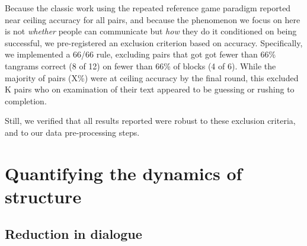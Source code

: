 Because the classic work using the repeated reference game paradigm reported near ceiling accuracy for all pairs, and because the phenomenon we focus on here is not \emph{whether} people can communicate but \emph{how} they do it conditioned on being successful, we pre-registered an exclusion criterion based on accuracy. 
Specifically, we implemented a 66/66 rule, excluding pairs that got got fewer than 66\% tangrams correct (8 of 12) on fewer than 66\% of blocks (4 of 6). 
While the majority of pairs (X\%) were at ceiling accuracy by the final round, this excluded K pairs who on examination of their text appeared to be guessing or rushing to completion.

Still, we verified that all results reported were robust to these exclusion criteria, and to our data pre-processing steps.

\section{Quantifying the dynamics of structure}\label{results}

\subsection{Reduction in dialogue}\label{listener-feedback}

